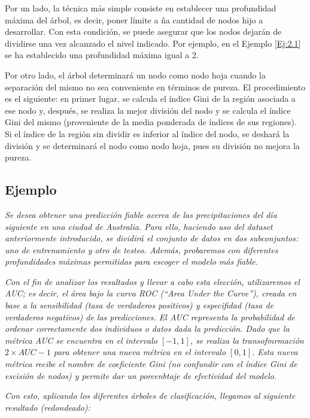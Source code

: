 \documentclass[12pt,twoside]{article}
\begin{document}
Por un lado, la técnica más simple consiste en establecer una profundidad máxima del árbol, es decir, poner límite a ña cantidad de nodos hijo a desarrollar. Con esta condición, se puede asegurar que los nodos dejarán de dividirse una vez alcanzado el nivel indicado. Por ejemplo, en el Ejemplo \ref{Ej:2.1} se ha establecido una profundidad máxima igual a 2.

Por otro lado, el árbol determinará un nodo como nodo hoja cuando la separación del mismo no sea conveniente en términos de pureza. El procedimiento es el siguiente: en primer lugar, se calcula el índice Gini de la región asociada a ese nodo y, después, se realiza la mejor división del nodo y se calcula el índice Gini del mismo (proveniente de la media ponderada de índices de sus regiones). Si el índice de la región sin dividir es inferior al índice del nodo, se deshará la división y se determinará el nodo como nodo hoja, pues su división no mejora la pureza.





\subsection{Ejemplo} \label{ex:CART}
\emph{Se desea obtener una predicción fiable acerca de las precipitaciones del día siguiente en una ciudad de Australia. Para ello, haciendo uso del dataset anteriormente introducido, se dividirá el conjunto de datos en dos subconjuntos: uno de entrenamiento y otro de testeo. Además, probaremos con diferentes profundidades máximas permitidas para escoger el modelo más fiable.}

\emph{Con el fin de analizar los resultados y llevar a cabo esta elección, utilizaremos el AUC; es decir, el área bajo la curva ROC (``Area Under the Curve''), creada en base a la sensibilidad (tasa de  verdaderos positivos) y especifidad (tasa de verdaderos negativos) de las predicciones. El AUC representa la probabilidad de ordenar correctamente dos individuos o datos dada la predicción. Dado que la métrica AUC se encuentra en el intervalo $[-1,1]$, se realiza la transofmrmación  $2 \times AUC - 1$ para obtener una nueva métrica en el intervalo $[0,1]$. Esta nueva métrica recibe el nombre de coeficiente Gini (no confundir con el índice Gini de escisión de nodos) y permite dar un porcenbtaje de efectividad del modelo.}

\emph{Con esto, aplicando los diferentes árboles de clasificación, llegamos al siguiente resultado (redondeado):}
\end{document}
